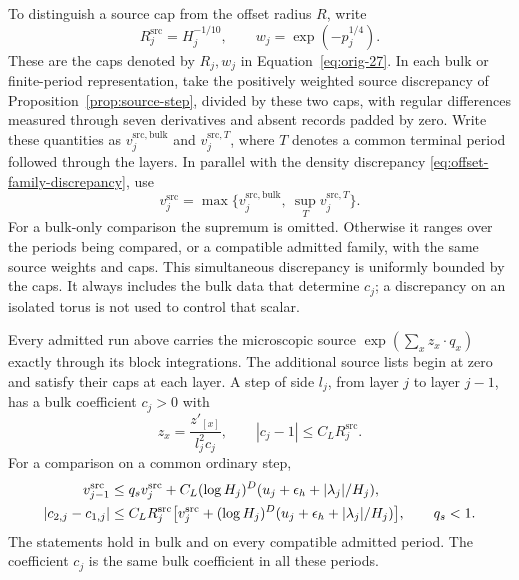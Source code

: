 To distinguish a source cap from the offset radius $R$, write
\[
 R_j^{\mathrm{src}}=H_j^{-1/10},\qquad
 w_j=\exp(-p_j^{1/4}).
\]
These are the caps denoted by $R_j,w_j$ in
Equation~\eqref{eq:orig-27}.  In each bulk or finite-period
representation, take the positively weighted source discrepancy of
Proposition~\ref{prop:source-step}, divided by these two caps, with
regular differences measured through seven derivatives and absent
records padded by zero.  Write these quantities as
$v_j^{\mathrm{src,bulk}}$ and $v_j^{\mathrm{src},T}$, where $T$ denotes
a common terminal period followed through the layers.  In parallel
with the density discrepancy \eqref{eq:offset-family-discrepancy}, use
\begin{equation}
 v_j^{\mathrm{src}}
 =\max\bigl\{v_j^{\mathrm{src,bulk}},\ 
                  \sup_T v_j^{\mathrm{src},T}\bigr\}.
 \label{eq:offset-family-source-discrepancy}
\end{equation}
For a bulk-only comparison the supremum is omitted.  Otherwise it
ranges over the periods being compared, or a compatible admitted
family, with the same source weights and caps.  This simultaneous
discrepancy is uniformly bounded by the caps.  It always includes the
bulk data that determine $c_j$; a discrepancy on an isolated torus
is not used to control that scalar.

\begin{proposition}
\label{prop:source-input}
Every admitted run above carries the microscopic source
$\exp(\sum_x z_x\cdot q_x)$ exactly through its block integrations.
The additional source lists begin at zero and satisfy their caps at
each layer.  A step of side $l_j$, from layer $j$ to layer $j-1$, has a
bulk coefficient $c_j>0$ with
\begin{equation}
 z_x=\frac{z'_{[x]}}{l_j^2c_j},\qquad
 |c_j-1|\le C_LR_j^{\mathrm{src}}.
 \label{eq:offset-source-substitution}
\end{equation}
For a comparison on a common ordinary step,
\begin{align}
 v_{j-1}^{\mathrm{src}}
 &\le q_s v_j^{\mathrm{src}}
 +C_L(\log H_j)^D
        (u_j+\epsilon_h+|\lambda_j|/H_j),\notag\\
 |c_{2,j}-c_{1,j}|
 &\le C_LR_j^{\mathrm{src}}
 \bigl[v_j^{\mathrm{src}}+(\log H_j)^D
        (u_j+\epsilon_h+|\lambda_j|/H_j)\bigr],
 \qquad q_s<1.
 \label{eq:offset-source-comparison}
\end{align}
The statements hold in bulk and on every compatible admitted period.
The coefficient $c_j$ is the same bulk coefficient in all these periods.
\end{proposition}

